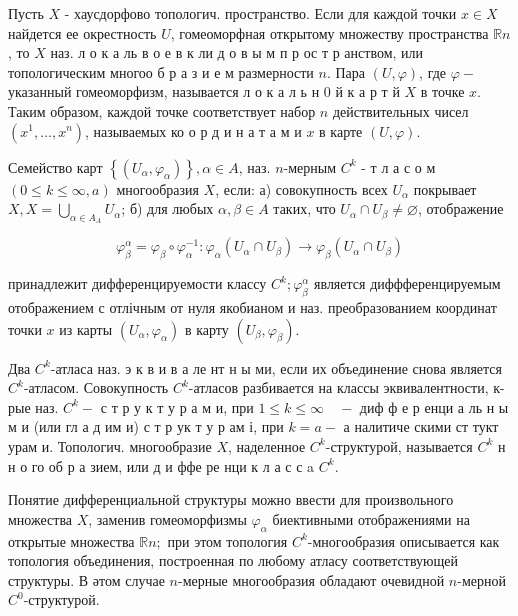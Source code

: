 \documentclass[10pt]{article}
\begin{document}
Пусть $X$ - хаусдорфово топологич. пространство. Если для каждой точки $x \in X$ найдется ее окрестность $U$, гомеоморфная открытому множеству пространства $\mathbb{R} n$, то $X$ наз. л о к а ль в о е в к ли д о в ы м п р ос т р анством, или топологическим многоо б р а з и е м размерности $n$. Пара $(U, \varphi)$, где $\varphi-$ указанный гомеоморфизм, называется л $о$ к а л ь н 0 й к а р т й $X$ в точке $x$. Таким образом, каждой точке соответствует набор $n$ действительных чисел $\left(x^{1}, \ldots, x^{n}\right)$, называемых ко о р д и н а т а м и $x$ в карте $(U, \varphi)$.



Семейство карт $\left\{\left(U_{\alpha}, \varphi_{\alpha}\right)\right\}, \alpha \in A$, наз. $n$-мерным $C^{k}$ - т л а с о м $(0 \leqslant k \leqslant \infty, a)$ многообразия $X$, если: а) совокупность всех $U_{\alpha}$ покрывает $X, X=\bigcup_{\alpha \in A_{A}} U_{\alpha}$; б) для любых $\alpha, \beta \in A$ таких, что $U_{\alpha} \cap U_{\beta} \neq \varnothing$, отображение



\[

\varphi_{\beta}^{\alpha}=\varphi_{\beta} \circ \varphi_{\alpha}^{-1}: \varphi_{\alpha}\left(U_{\alpha} \cap U_{\beta}\right) \longrightarrow \varphi_{\beta}\left(U_{\alpha} \cap U_{\beta}\right)

\]



принадлежит дифференцируемости классу $C^{k} ; \varphi_{\beta}^{\alpha}$ является диффференцируемым отображением с отлічным от нуля якобианом и наз. преобразованием координат точки $x$ из карты $\left(U_{\alpha}, \varphi_{\alpha}\right)$ в карту $\left(U_{\beta}, \varphi_{\beta}\right)$.



Два $C^{k}$-атласа наз. э к в и в а ле нт н ы ми, если их объединение снова является $C^{k}$-атласом. Совокупность $C^{k}$-атласов разбивается на классы эквивалентности, к-рые наз. $C^{k}-$ с т р у к т у р а м и, при $1 \leqslant k \leqslant \infty \quad-$ диф ф е р енци а ль н ы м и (или гл а д им и) с т р ук т у р ам і, при $k=a-$ а налитиче скими ст тукт урам и. Топологич. многообразие $X$, наделенное $C^{k}$-структурой, называется $C^{k}$ н н о го об р а зием, или д и ффе ре нци к л а с с a $C^{k}$.



Понятие дифференциальной структуры можно ввести для произвольного множества $X$, заменив гомеоморфизмы $\varphi_{\alpha}$ биективными отображениями на открытые множества $\mathbb{R} n ;$ при этом топология $C^{k}$-многообразия описывается как топология объединения, построенная по любому атласу соответствующей структуры. В әтом случае $n$-мерные многообразия обладают очевидной $n$-мерной $C^{0}$-структурой.
\end{document}
